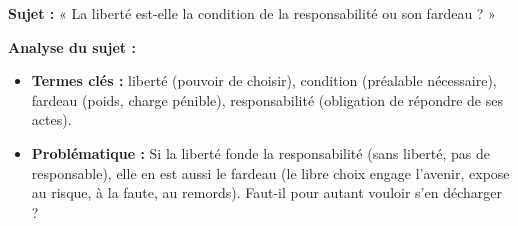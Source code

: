 \documentclass[11pt]{article}
\begin{document}
\begin{exoresolu}
\textbf{Sujet :} « La liberté est-elle la condition de la responsabilité ou son fardeau ? »

\textbf{Analyse du sujet :}
\begin{itemize}
    \item \textbf{Termes clés :} liberté (pouvoir de choisir), condition (préalable nécessaire), fardeau (poids, charge pénible), responsabilité (obligation de répondre de ses actes).
    \item \textbf{Problématique :} Si la liberté fonde la responsabilité (sans liberté, pas de responsable), elle en est aussi le fardeau (le libre choix engage l'avenir, expose au risque, à la faute, au remords). Faut-il pour autant vouloir s'en décharger ?
\end{itemize}


\end{exoresolu}
\end{document}
